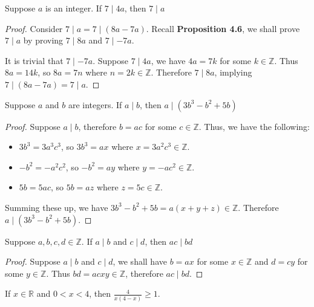 \documentclass{exam}
\begin{document}
\begin{proposition}{4.9}
    Suppose $a$ is an integer. If $7 \mid 4a$, then $7 \mid a$
\end{proposition}

\begin{proof}
    Consider $7 \mid a = 7 \mid (8a - 7a)$. Recall \textbf{Proposition 4.6}, we shall prove $7 \mid a$ by proving $7\mid 8a$ and $7\mid-7a$.

    It is trivial that $7\mid -7a$. Suppose $7 \mid 4a$, we have $4a = 7k$ for some $k \in\mathbb{Z}$. Thus $8a = 14k$, so $8a = 7n$ where $n = 2k \in \mathbb{Z}$. Therefore $7\mid8a$, implying $7 \mid (8a - 7a) = 7\mid a$.
\end{proof}

\begin{proposition}{4.10}
    Suppose $a$ and $b$ are integers. If $a\mid b$, then $a \mid (3b^3-b^2+5b)$
\end{proposition}

\begin{proof}
    Suppose $a \mid b$, therefore $b = ac$ for some $c\in\mathbb Z$. Thus, we have the following:
    \begin{itemize}
        \item $3b^3 = 3a^3c^3$, so $3b^3 = ax$ where $x = 3a^2c^3 \in\mathbb Z$.
        \item $-b^2 = -a^2c^2$, so $-b^2 = ay$ where $y = -ac^2 \in\mathbb Z$.
        \item $5b = 5ac$, so $5b = az$ where $z = 5c\in\mathbb Z$.
    \end{itemize}
    Summing these up, we have $3b^3 -b^2+5b = a(x + y + z) \in\mathbb Z$. Therefore $a\mid(3b^3-b^2+5b)$.
\end{proof}

\begin{proposition}{4.11}
    Suppose $a, b,c,d\in\mathbb Z$. If $a\mid b$ and $c\mid d$, then $ac\mid bd$
\end{proposition}

\begin{proof}
    Suppose $a\mid b$ and $c\mid d$, we shall have $b=ax$ for some $x\in\mathbb Z$ and $d = cy$ for some $y\in\mathbb Z$. Thus $bd = acxy\in\mathbb Z$, therefore $ac\mid bd$.
\end{proof}

\begin{proposition}{4.12}
    If $x\in\mathbb R$ and $0 < x < 4$, then $\frac{4}{x(4-x)}\ge 1$.
\end{proposition}
\end{document}

